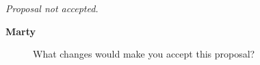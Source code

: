 \documentclass[12pt, a4paper]{article}
\newcommand{\speak}[2]{\begin{description}\item[\textbf{#1}]#2\end{description}}
\begin{document}







\textit{Proposal not accepted.}





\speak{Marty}{What changes would make you accept this proposal?}
\end{document}
